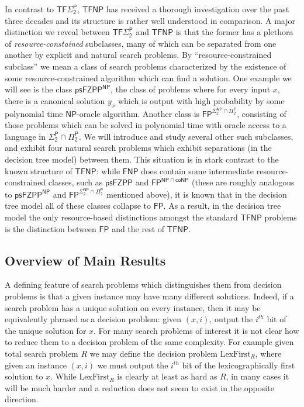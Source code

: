 In contrast to $\mathsf{TF\Sigma_2^P}$, $\mathsf{TFNP}$ has received a thorough investigation over the past three decades and its structure is rather well understood in comparison. 
A major distinction we reveal between $\mathsf{TF\Sigma_2^P}$ and $\mathsf{TFNP}$ is that the former has a plethora of \emph{resource-constained} subclasses, many of which can be separated from one another by explicit and natural search problems. 
By ``resource-constrained subclass'' we mean a class of search problems characterized by the existence of some resource-constrained algorithm which can find a solution. One example we will see is the class $\mathsf{psFZPP^{NP}}$, the class of problems where for every input $x$, there is a canonical solution $y_x$ which is output with high probability by some polynomial time $\mathsf{NP}$-oracle algorithm. 
Another class is $\mathsf{FP^{\Sigma_2^{NP} \cap \Pi_2^P}}$, consisting of those problems which can be solved in polynomial time with oracle access to a language in $\mathsf{\Sigma_2^P \cap \Pi_2^P}$. We will introduce and study several other such subclasses, and exhibit four natural search problems which exhibit separations (in the decision tree model) between them. 
This situation is in stark contrast to the known structure of $\mathsf{TFNP}$: while $\mathsf{FNP}$ does contain some intermediate resource-constrained classes, such as $\mathsf{psFZPP}$ and $\mathsf{FP^{NP \cap coNP}}$ (these are roughly analogous to $\mathsf{psFZPP^{NP}}$ and $\mathsf{FP^{\Sigma_2^{NP} \cap \Pi_2^P}}$ mentioned above), it is known that in the decision tree model all of these classes collapse to $\mathsf{FP}$. 
As a result, in the decision tree model the only resource-based distinctions amongst the standard $\mathsf{TFNP}$ problems is the distinction between $\mathsf{FP}$ and the rest of $\mathsf{TFNP}$.

\subsection{Overview of Main Results} 
A defining feature of search problems which distinguishes them from decision problems is that a given instance may have many different solutions. 
Indeed, if a search problem has a unique solution on every instance, then it may be equivalently phrased as a decision problem: given $(x,i)$, output the $i^{th}$ bit of the unique solution for $x$.
For many search problems of interest it is not clear how to reduce them to a decision problem of the same complexity. For example given total search problem $R$ we may define the decision problem $\mathrm{LexFirst}_R$, where given an instance $(x,i)$ we must output the $i^{th}$ bit of the lexicographically first solution to $x$. While $\mathrm{LexFirst}_R$ is clearly at least as hard as $R$, in many cases it will be much harder and a reduction does not seem to exist in the opposite direction. 


